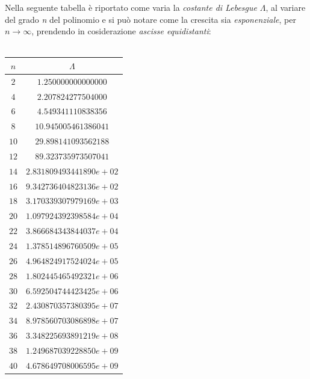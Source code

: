 Nella seguente tabella è riportato come varia la \textit{costante di Lebesgue} $\Lambda$, al variare del grado \textit{n} del polinomio e si può notare come la crescita sia \textit{esponenziale}, per $n\rightarrow\infty$, prendendo in cosiderazione \textit{ascisse equidistanti}:\\\
\begin{center}
	\begin{tabular}{|c|c|}
		\hline
		$n$ & $\Lambda$ \\
		\hline
		$2$  & $1.250000000000000$ \\ 
		$4$  & $2.207824277504000$ \\ 
		$6$  & $4.549341110838356$ \\ 
		$8$  & $10.945005461386041$ \\ 
		$10$ & $29.898141093562188$ \\ 
		$12$ & $89.323735973507041$ \\ 
		$14$ & $2.831809493441890e+02$ \\ 
		$16$ & $9.342736404823136e+02$ \\ 
		$18$ & $3.170339307979169e+03$ \\ 
		$20$ & $1.097924392398584e+04$ \\ 
		$22$ & $3.866684343844037e+04$ \\ 
		$24$ & $1.378514896760509e+05$ \\ 
		$26$ & $4.964824917524024e+05$ \\ 
		$28$ & $1.802445465492321e+06$ \\ 
		$30$ & $6.592504744423425e+06$ \\ 
		$32$ & $2.430870357380395e+07$ \\ 
		$34$ & $8.978560703086898e+07$ \\ 
		$36$ & $3.348225693891219e+08$ \\ 
		$38$ & $1.249687039228850e+09$ \\ 
		$40$ & $4.678649708006595e+09$ \\ 
		\hline
	\end{tabular}
\end{center} 

